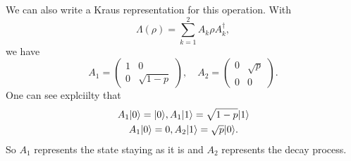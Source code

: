 We can also write a Kraus representation for this operation. With
\begin{equation}
    \Lambda(\rho)=\sum_{k=1}^2 A_k \rho A_k^\dagger,
\end{equation}
we have
\begin{equation}
    A_1=\begin{pmatrix} 1& 0 \\
    0& \sqrt{1-p}
    \end{pmatrix},
    \quad
    A_2 = \begin{pmatrix}
    0 &\sqrt{p}\\
    0 &0
    \end{pmatrix}.
\end{equation}
One can see explciilty that
\begin{gather}
    A_1\lvert0\rangle= \lvert0\rangle, A_1\lvert1\rangle =\sqrt{1-p}\lvert1\rangle\\
    A_1 \lvert0\rangle = 0, A_2 \lvert1\rangle=\sqrt{p}\lvert0\rangle.
\end{gather}
So $A_1$ represents the state staying as it is and $A_2$ represents the decay process.

